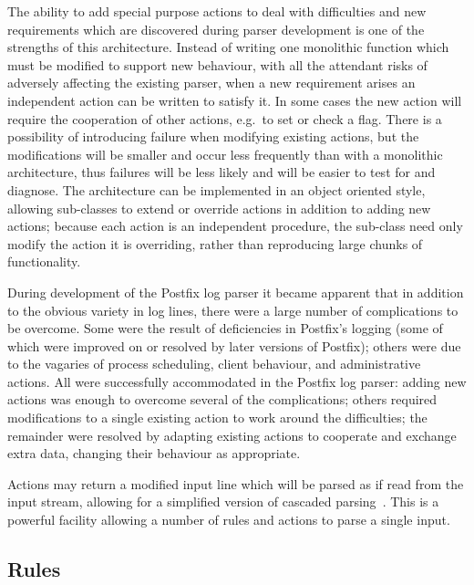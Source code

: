 \documentclass{svmult}
\begin{document}
The ability to add special purpose actions to deal with difficulties and
new requirements which are discovered during parser development is one of
the strengths of this architecture.  Instead of writing one monolithic
function which must be modified to support new behaviour, with all the
attendant risks of adversely affecting the existing parser, when a new
requirement arises an independent action can be written to satisfy it.  In
some cases the new action will require the cooperation of other actions,
e.g.\ to set or check a flag.  There is a possibility of introducing
failure when modifying existing actions, but the modifications will be
smaller and occur less frequently than with a monolithic architecture, thus
failures will be less likely and will be easier to test for and diagnose.
The architecture can be implemented in an object oriented style, allowing
sub-classes to extend or override actions in addition to adding new
actions; because each action is an independent procedure, the sub-class
need only modify the action it is overriding, rather than reproducing large
chunks of functionality.

During development of the Postfix log parser it became apparent that in
addition to the obvious variety in log lines, there were a large number of
complications to be overcome.  Some were the result of deficiencies in
Postfix's logging (some of which were improved on or resolved by later
versions of Postfix); others were due to the vagaries of process
scheduling, client behaviour, and administrative actions.  All were
successfully accommodated in the Postfix log parser: adding new actions was
enough to overcome several of the complications; others required
modifications to a single existing action to work around the difficulties;
the remainder were resolved by adapting existing actions to cooperate and
exchange extra data, changing their behaviour as appropriate.

Actions may return a modified input line which will be parsed as if read
from the input stream, allowing for a simplified version of cascaded
parsing~\cite{cascaded-parsing}.  This is a powerful facility allowing a
number of rules and actions to parse a single input.

\subsection{Rules}

\label{Rules}
\end{document}
